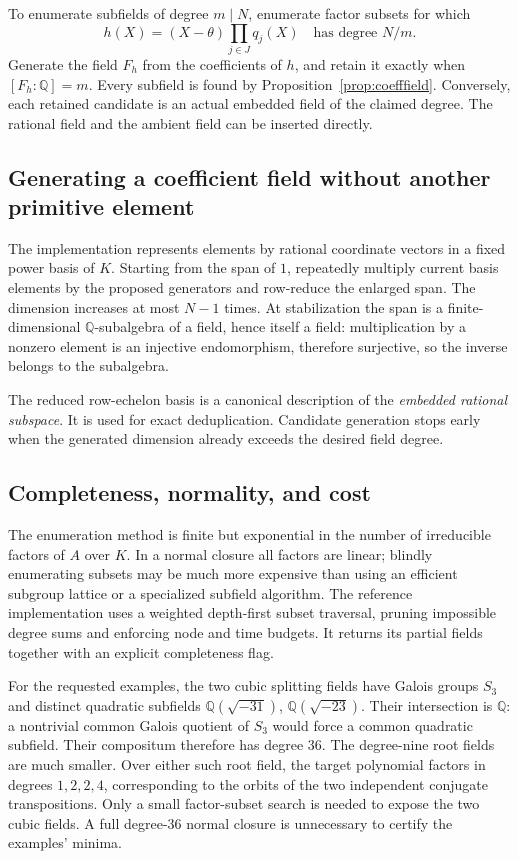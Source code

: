 \documentclass[11pt,a4paper]{article}
\theoremstyle{definition}\newtheorem{definition}[theorem]{Definition}
\theoremstyle{remark}\newtheorem{remark}[theorem]{Remark}
\newcommand{\Q}{\mathbb Q}\newcommand{\C}{\mathbb C}\newcommand{\Z}{\mathbb Z}
\begin{document}
To enumerate subfields of degree $m\mid N$, enumerate factor subsets for which
\[
 h(X)=(X-\theta)\prod_{j\in J}q_j(X)
 \quad\text{has degree }N/m.
\]
Generate the field $F_h$ from the coefficients of $h$, and retain it exactly when $[F_h:\Q]=m$. Every subfield is found by Proposition~\ref{prop:coefffield}. Conversely, each retained candidate is an actual embedded field of the claimed degree. The rational field and the ambient field can be inserted directly.

\subsection{Generating a coefficient field without another primitive element}
The implementation represents elements by rational coordinate vectors in a fixed power basis of $K$. Starting from the span of $1$, repeatedly multiply current basis elements by the proposed generators and row-reduce the enlarged span. The dimension increases at most $N-1$ times. At stabilization the span is a finite-dimensional $\Q$-subalgebra of a field, hence itself a field: multiplication by a nonzero element is an injective endomorphism, therefore surjective, so the inverse belongs to the subalgebra.

The reduced row-echelon basis is a canonical description of the \emph{embedded rational subspace}. It is used for exact deduplication. Candidate generation stops early when the generated dimension already exceeds the desired field degree.

\subsection{Completeness, normality, and cost}
The enumeration method is finite but exponential in the number of irreducible factors of $A$ over $K$. In a normal closure all factors are linear; blindly enumerating subsets may be much more expensive than using an efficient subgroup lattice or a specialized subfield algorithm. The reference implementation uses a weighted depth-first subset traversal, pruning impossible degree sums and enforcing node and time budgets. It returns its partial fields together with an explicit completeness flag.

For the requested examples, the two cubic splitting fields have Galois groups $S_3$ and distinct quadratic subfields $\Q(\sqrt{-31})$, $\Q(\sqrt{-23})$. Their intersection is $\Q$: a nontrivial common Galois quotient of $S_3$ would force a common quadratic subfield. Their compositum therefore has degree $36$. The degree-nine root fields are much smaller. Over either such root field, the target polynomial factors in degrees $1,2,2,4$, corresponding to the orbits of the two independent conjugate transpositions. Only a small factor-subset search is needed to expose the two cubic fields. A full degree-36 normal closure is unnecessary to certify the examples' minima.
\end{document}
